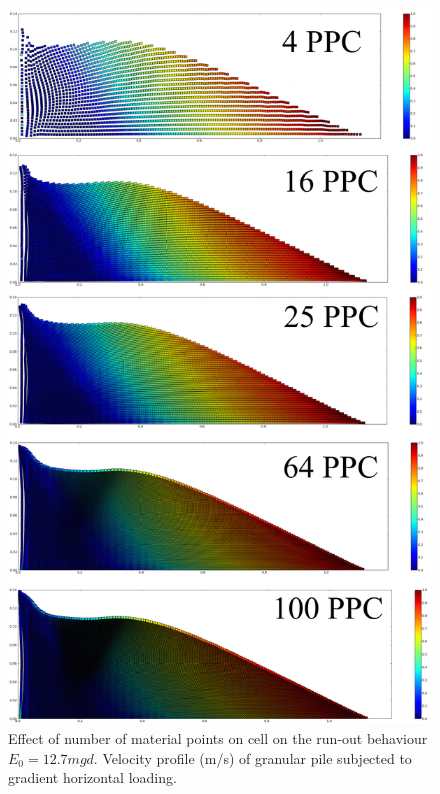 \begin{figure}[tbhp]
\centering
\includegraphics[height=\textheight]{MPM_50ppc}
\caption{Effect of number of material points on cell on the run-out behaviour 
$E_0=12.7mgd$. 
Velocity profile (\si{\m/\s}) of granular pile subjected to gradient horizontal 
loading.}
\label{fig:MPM_50ppc}
\end{figure}



